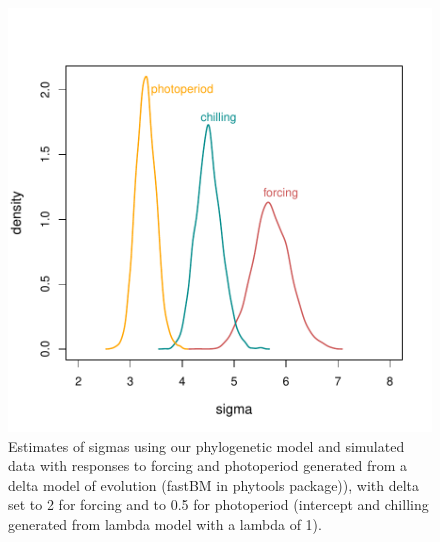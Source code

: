 \documentclass[11pt]{article}
\begin{document}
\clearpage
\begin{figure}
  \begin{center}
  \includegraphics[width=14cm]{../../analyses/phylogeny/figures/burstmodelfigquick.pdf}
  \caption{Estimates of sigmas using our phylogenetic model and simulated data with responses to forcing and photoperiod generated from a delta model of evolution (fastBM in phytools package)), with delta set to 2 for forcing and to 0.5 for photoperiod (intercept and chilling generated from lambda model with a lambda of 1).}
  \label{fig:burstmodels}
  \end{center}
\end{figure}


\clearpage
\end{document}
